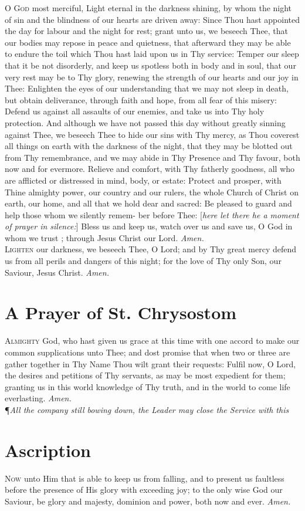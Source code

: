 \lettrine{O}{ God} most merciful, Light eternal in the darkness shining, by whom the night of sin and the blindness of our hearts are driven away: Since Thou hast appointed the day for labour and the night for rest; grant unto us, we beseech Thee, that our bodies may repose in peace and quietness, that afterward they may be able to endure the toil which Thou hast laid upon us in Thy service: Temper our sleep that it be not disorderly, and keep us spotless both in body and in soul, that our very rest may be to Thy glory, renewing the strength of our hearts and our joy in Thee: Enlighten the eyes of our understanding that we may not sleep in death, but obtain deliverance, through faith and hope, from all fear of this misery: Defend us against all assaults of our enemies, and take us into Thy holy protection.
And although we have not passed this day without greatly sinning against Thee, we beseech Thee to hide our sins with Thy mercy, as Thou coverest all things on earth with the darkness of the night, that they may be blotted out from Thy remembrance, and we may abide in Thy Presence and Thy favour, both now and for evermore.
Relieve and comfort, with Thy fatherly goodness, all who are afflicted or distressed in mind, body, or estate: Protect and prosper, with Thine almighty power, our country and our rulers, the whole Church of Christ on earth, our home, and all that we hold dear and sacred: Be pleased to guard and help those whom we silently remem- ber before Thee: [\textit{here let there he a moment of prayer in silence:}] Bless us and keep us, watch over us and save us, O God in whom we trust ; through Jesus Christ our Lord.
\textit{Amen.} \\

\lettrine{L}{ighten} our darkness, we beseech Thee, O Lord; and by Thy great mercy defend us from all perils and dangers of this night; for the love of Thy only Son, our Saviour, Jesus Christ.
\textit{Amen.} 

\section*{A Prayer of St. Chrysostom}  

\lettrine{A}{lmighty} God, who hast given us grace at this time with one accord to make our common supplications unto Thee; and dost promise that when two or three are gather together in Thy Name Thou wilt grant their requests: Fulfil now, O Lord, the desires and petitions of Thy servants, as may be most expedient for them; granting us in this world knowledge of Thy truth, and in the world to come life everlasting.
\textit{Amen.} \\

\noindent\P\textit{All the company still bowing down, the Leader may close the Service with this}

\section*{Ascription}

\lettrine{N}{ow} unto Him that is able to keep us from falling, and to present us faultless before the presence of His glory with exceeding joy; to the only wise God our Saviour, be glory and majesty, dominion and power, both now and ever.
\textit{Amen.} 
